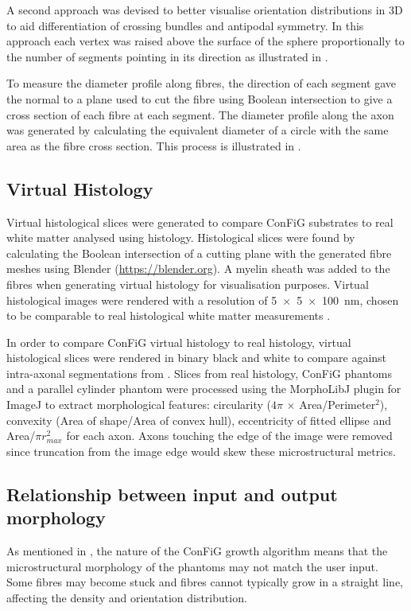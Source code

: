 A second approach was devised to better visualise orientation distributions in 3D to aid differentiation of crossing bundles and antipodal symmetry. In this approach each vertex was raised above the surface of the sphere proportionally to the number of segments pointing in its direction as illustrated in .

To measure the diameter profile along fibres, the direction of each segment gave the normal to a plane used to cut the fibre using Boolean intersection to give a cross section of each fibre at each segment. The diameter profile along the axon was generated by calculating the equivalent diameter of a circle with the same area as the fibre cross section. This process is illustrated in .

\subsection{Virtual Histology}
\label{sec:confg_virtual_histology}
Virtual histological slices were generated to compare ConFiG substrates to real white matter analysed using histology. Histological slices were found by calculating the Boolean intersection of a cutting plane with the generated fibre meshes using Blender (\url{https://blender.org}). A myelin sheath was added to the fibres when generating virtual histology for visualisation purposes.  Virtual histological images were rendered with a resolution of \SI{5 x 5 x 100}{\nano\metre}, chosen to be comparable to real histological white matter measurements \cite{Abdollahzadeh2019,Lee2019b}.

In order to compare ConFiG virtual histology to real histology, virtual histological slices were rendered in binary black and white to compare against intra-axonal segmentations from \cite{Lee2019b}. Slices from real histology, ConFiG phantoms and a parallel cylinder phantom were processed using the MorphoLibJ plugin for ImageJ \cite{Rueden2017,Legland2016,Schindelin2012,Schneider2012} to extract morphological features: circularity ($4\pi$ × Area/Perimeter$^2$), convexity (Area of shape/Area of convex hull), eccentricity of fitted ellipse and Area/$\pi r_{max}^2$ for each axon. Axons touching the edge of the image were removed since truncation from the image edge would skew these microstructural metrics.

\subsection{Relationship between input and output morphology}
\label{sec:config_input_output_rel}
As mentioned in , the nature of the ConFiG growth algorithm means that the microstructural morphology of the phantoms may not match the user input. Some fibres may become stuck and fibres cannot typically grow in a straight line, affecting the density and orientation distribution.

